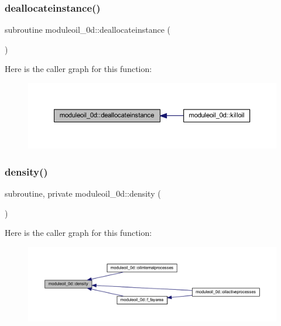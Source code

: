 \subsubsection{\texorpdfstring{deallocateinstance()}{deallocateinstance()}}
{\footnotesize\ttfamily subroutine moduleoil\+\_\+0d\+::deallocateinstance (\begin{DoxyParamCaption}{ }\end{DoxyParamCaption})\hspace{0.3cm}{\ttfamily [private]}}

Here is the caller graph for this function\+:\nopagebreak
\begin{figure}[H]
\begin{center}
\leavevmode
\includegraphics[width=350pt]{namespacemoduleoil__0d_af21b7b35e50b7197438d5bfc61cb5ac4_icgraph}
\end{center}
\end{figure}
\mbox{\label{namespacemoduleoil__0d_a365dbbed79663b6925c5964691b6fae2}} 
\subsubsection{\texorpdfstring{density()}{density()}}
{\footnotesize\ttfamily subroutine, private moduleoil\+\_\+0d\+::density (\begin{DoxyParamCaption}{ }\end{DoxyParamCaption})\hspace{0.3cm}{\ttfamily [private]}}

Here is the caller graph for this function\+:\nopagebreak
\begin{figure}[H]
\begin{center}
\leavevmode
\includegraphics[width=350pt]{namespacemoduleoil__0d_a365dbbed79663b6925c5964691b6fae2_icgraph}
\end{center}
\end{figure}
\mbox{\label{namespacemoduleoil__0d_acebfecd3789a27099dd53ae338cb4b64}} 
